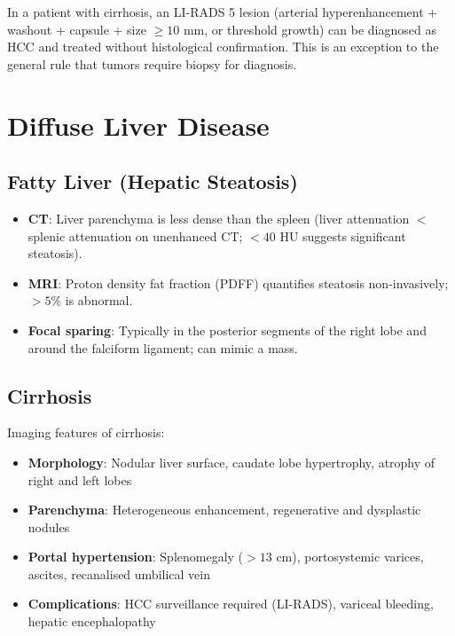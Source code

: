 \begin{pearlbox}[LI-RADS 5 = HCC, no biopsy needed]
In a patient with cirrhosis, an LI-RADS 5 lesion (arterial hyperenhancement + washout + capsule + size $\geq 10$ mm, or threshold growth) can be diagnosed as HCC and treated without histological confirmation. This is an exception to the general rule that tumors require biopsy for diagnosis.
\end{pearlbox}


\section{Diffuse Liver Disease}

\subsection{Fatty Liver (Hepatic Steatosis)}
\begin{itemize}
  \item \textbf{CT}: Liver parenchyma is less dense than the spleen (liver attenuation $<$ splenic attenuation on unenhanced CT; $< 40$ HU suggests significant steatosis).
  \item \textbf{MRI}: Proton density fat fraction (PDFF) quantifies steatosis non-invasively; $> 5\%$ is abnormal.
  \item \textbf{Focal sparing}: Typically in the posterior segments of the right lobe and around the falciform ligament; can mimic a mass.
\end{itemize}

\subsection{Cirrhosis}
Imaging features of cirrhosis:
\begin{itemize}
  \item \textbf{Morphology}: Nodular liver surface, caudate lobe hypertrophy, atrophy of right and left lobes
  \item \textbf{Parenchyma}: Heterogeneous enhancement, regenerative and dysplastic nodules
  \item \textbf{Portal hypertension}: Splenomegaly ($> 13$ cm), portosystemic varices, ascites, recanalised umbilical vein
  \item \textbf{Complications}: HCC surveillance required (LI-RADS), variceal bleeding, hepatic encephalopathy
\end{itemize}


